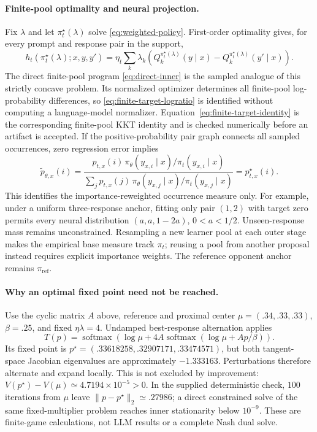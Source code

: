 \documentclass{article}
\theoremstyle{remark}
\theoremstyle{plain}
\newcommand{\piref}{\pi_{\mathrm{ref}}}
\begin{document}
\paragraph{Finite-pool optimality and neural projection.}
Fix $\lambda$ and let $\pi_t^\star(\lambda)$ solve \eqref{eq:weighted-policy}. First-order optimality gives, for every prompt and response pair in the support,
\begin{equation}
h_t(\pi_t^\star(\lambda);x,y,y')
=
\eta_t\sum_k\lambda_k
\left(
Q_k^{\pi_t^\star(\lambda)}(y\mid x)
-
Q_k^{\pi_t^\star(\lambda)}(y'\mid x)
\right).
\label{eq:prox-pairwise-kkt}
\end{equation}
The direct finite-pool program \eqref{eq:direct-inner} is the sampled analogue of this strictly concave problem. Its normalized optimizer determines all finite-pool log-probability differences, so \eqref{eq:finite-target-logratio} is identified without computing a language-model normalizer. Equation~\eqref{eq:finite-target-identity} is the corresponding finite-pool KKT identity and is checked numerically before an artifact is accepted. If the positive-probability pair graph connects all sampled occurrences, zero regression error implies
\[
\widetilde p_{\theta,x}(i)
=\frac{p_{t,x}(i)\,\pi_\theta(y_{x,i}\mid x)/\pi_t(y_{x,i}\mid x)}
{\sum_j p_{t,x}(j)\,\pi_\theta(y_{x,j}\mid x)/\pi_t(y_{x,j}\mid x)}
=p_{t,x}^\star(i).
\]
This identifies the importance-reweighted occurrence measure only. For example, under a uniform three-response anchor, fitting only pair $(1,2)$ with target zero permits every neural distribution $(a,a,1-2a)$, $0<a<1/2$. Unseen-response mass remains unconstrained. Resampling a new learner pool at each outer stage makes the empirical base measure track $\pi_t$; reusing a pool from another proposal instead requires explicit importance weights. The reference opponent anchor remains $\piref$.

\paragraph{Why an optimal fixed point need not be reached.}
\label{app:direct-stability}
Use the cyclic matrix $A$ above, reference and proximal center $\mu=(.34,.33,.33)$, $\beta=.25$, and fixed $\eta\lambda=4$. Undamped best-response alternation applies
\[
T(p)=\operatorname{softmax}\!\left(\log\mu+
4A\operatorname{softmax}(\log\mu+Ap/\beta)\right).
\]
Its fixed point is $p^\star=(.33618258,.32907171,.33474571)$, but both tangent-space Jacobian eigenvalues are approximately $-1.333163$. Perturbations therefore alternate and expand locally. This is not excluded by improvement: $V(p^\star)-V(\mu)\simeq4.7194\times10^{-5}>0$. In the supplied deterministic check, $100$ iterations from $\mu$ leave $\|p-p^\star\|_2\simeq.27986$; a direct constrained solve of the same fixed-multiplier problem reaches inner stationarity below $10^{-9}$. These are finite-game calculations, not LLM results or a complete Nash dual solve.
\end{document}
